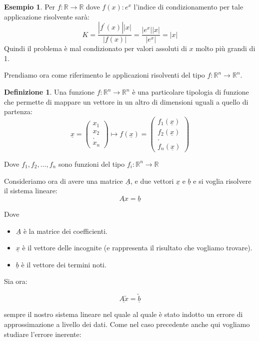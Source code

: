 \documentclass[12pt, a4paper]{book}
\theoremstyle{definition}
\newtheorem{exmp}{Esempio}[section]
\newtheorem{defn}{Definizione}[section]
\newcommand{\VarMtrx}[1]{\ensuremath{\underline{#1}}}
\begin{document}
\begin{flushleft}
\begin{exmp}
Per $f: \mathbb{R} \rightarrow \mathbb{R}$ dove $f(x): e^{x}$ l'indice di condizionamento per tale applicazione risolvente sarà: 
\[ K = \frac{|f^{'}(x)| |x|}{|f(x)|} = \frac{|e^{x}||x|}{|e^{x}|} = |x| \]
Quindi il problema è mal condizionato per valori assoluti di $x$ molto più grandi di 1.
\end{exmp}

Prendiamo ora come riferimento le applicazioni risolventi del tipo $f: \mathbb{R}^{n} \rightarrow \mathbb{R}^{n}$. 

\begin{defn}
Una funzione  $f: \mathbb{R}^{n} \rightarrow \mathbb{R}^{n}$ è una particolare tipologia di funzione che permette di mappare un vettore in un altro di dimensioni uguali a quello di partenza:  
\[ \VarMtrx{x} = \begin{pmatrix} x_{1} \\ x_{2} \\ .\\ x_{n}  \end{pmatrix} \mapsto f(\VarMtrx{x}) = \begin{pmatrix} f_{1}(\VarMtrx{x}) \\ f_{2}(\VarMtrx{x}) \\ .\\ f_{n}(\VarMtrx{x})  \end{pmatrix}  \]

Dove $f_{1},  f_{2},  \dots,  f_{n}$ sono funzioni del tipo $f_{i}: \mathbb{R}^{n} \rightarrow \mathbb{R}$

\end{defn}

Consideriamo ora di avere una matrice $\VarMtrx{A}$,  e due vettori $\VarMtrx{x}$ e $\VarMtrx{b}$ e si voglia risolvere il sistema lineare: 
\[ \VarMtrx{Ax} = \VarMtrx{b} \]

Dove 
\begin{itemize}
	\item $\VarMtrx{A}$ è la matrice dei coefficienti.
	\item $\VarMtrx{x}$ è il vettore delle incognite (e rappresenta il risultato che vogliamo trovare).
	\item $\VarMtrx{b}$ è il vettore dei termini noti.
\end{itemize}

Sia ora:

\[ \VarMtrx{A\tilde{x}} = \VarMtrx{\tilde{b}} \]

sempre il nostro sistema lineare nel quale al quale è stato indotto un errore di approssimazione a livello dei dati.  Come nel caso precedente anche qui vogliamo studiare l'errore inerente:


\end{flushleft}
\end{document}
